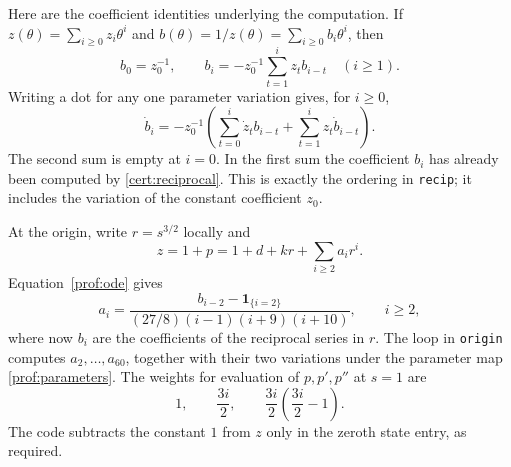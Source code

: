Here are the coefficient identities underlying the computation.
If \(z(\theta)=\sum_{i\ge0}z_i\theta^i\) and
\(b(\theta)=1/z(\theta)=\sum_{i\ge0}b_i\theta^i\), then
\begin{equation}\label{cert:reciprocal}
 b_0=z_0^{-1},\qquad
 b_i=-z_0^{-1}\sum_{t=1}^i z_t b_{i-t}\quad(i\ge1).
\end{equation}
Writing a dot for any one parameter variation gives, for \(i\ge0\),
\begin{equation}\label{cert:tangent-reciprocal}
 \dot b_i=-z_0^{-1}
 \left(\sum_{t=0}^i\dot z_t b_{i-t}
             +\sum_{t=1}^i z_t\dot b_{i-t}\right).
\end{equation}
The second sum is empty at \(i=0\).  In the first sum the coefficient \(b_i\)
has already been computed by \eqref{cert:reciprocal}.  This is exactly the
ordering in \texttt{recip}; it includes the variation of the constant
coefficient \(z_0\).

At the origin, write \(r=s^{3/2}\) locally and
\[
 z=1+p=1+d+kr+\sum_{i\ge2}a_i r^i.
\]
Equation~\eqref{prof:ode} gives
\begin{equation}\label{cert:origin-recurrence}
 a_i=\frac{b_{i-2}-\mathbf1_{\{i=2\}}}
 { (27/8)(i-1)(i+9)(i+10)},\qquad i\ge2,
\end{equation}
where now \(b_i\) are the coefficients of the reciprocal series in \(r\).
The loop in \texttt{origin} computes \(a_2,\ldots,a_{60}\), together with
their two variations under the parameter map \eqref{prof:parameters}.
The weights for evaluation of \(p,p',p''\) at \(s=1\) are
\[
 1,\qquad \frac{3i}{2},\qquad
 \frac{3i}{2}\left(\frac{3i}{2}-1\right).
\]
The code subtracts the constant \(1\) from \(z\) only in the zeroth state
entry, as required.

